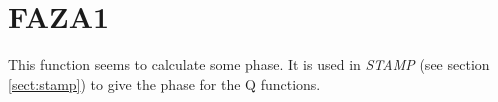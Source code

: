 \section{FAZA1}
\label{sect:faza1}

\noindent This function seems to calculate some phase. It is used in {\em
STAMP} (see section \ref{sect:stamp}) to give the phase for the Q functions.\\
